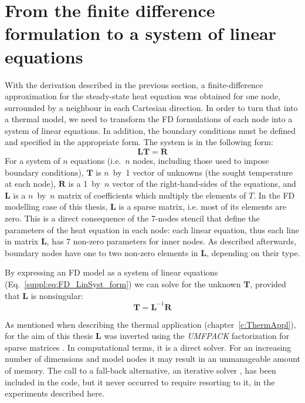 \section[
    tocentry={From the FD formulation to a system of linear equations},
    head={From the FD formulation to a system of linear equations}
    ]{From the finite difference formulation to a system of linear equations}
\label{s:ThermModel:FD_LinSyst}

With the derivation described in the previous section, a finite-difference approximation for the steady-state heat equation was obtained for one node, surrounded by a neighbour in each Cartesian direction.
In order to turn that into a thermal model, we need to transform the FD formulations of each node into a system of linear equations.
In addition, the boundary conditions must be defined and specified in the appropriate form.
The system is in the following form:
\begin{equation}
    \label{suppl:eq:FD_LinSyst_form}
    \bm{L} \bm{T} = \bm{R}
\end{equation}
For a system of $n$ equations (i.e.~$n$ nodes, including those used to impose boundary conditions), $\bm{T}$ is $n$~by~\num{1} vector of unknowns (the sought temperature at each node), $\bm{R}$ is a \num{1}~by~$n$ vector of the right-hand-sides of the equations, and $\bm{L}$ is a $n$~by~$n$ matrix of coefficients which multiply the elements of $T$.
In the FD modelling case of this thesis, $\bm{L}$ is a sparse matrix, i.e. most of its elements are zero.
This is a direct consequence of the 7-nodes stencil that define the parameters of the heat equation in each node: each linear equation, thus each line in matrix $\bm{L}$, has 7 non-zero parameters for inner nodes.
As described afterwards, boundary nodes have one to two non-zero elements in $\bm{L}$, depending on their type.

By expressing an FD model as a system of linear equations (Eq.~\ref{suppl:eq:FD_LinSyst_form}) we can solve for the unknown $\bm{T}$, provided that $\bm{L}$ is nonsingular:
\begin{equation}
    \label{suppl:eq:FD_LinSyst_inversion}
    \bm{T} = \bm{L}^{-1} \bm{R}
\end{equation}

As mentioned when describing the thermal application (chapter~\ref{c:ThermAppl}), for the aim of this thesis $\bm{L}$ was inverted using the \textit{UMFPACK} factorization for sparse matrices \parencite{Davis2006}.
In computational terms, it is a direct solver.
For an increasing number of dimensions and model nodes it may result in an unmanageable amount of memory.
The call to a fall-back alternative, an iterative solver \parencite[the generalized minimal residual method, \textit{gmres}, see][]{Saad1986gmres}, has been included in the code, but it never occurred to require resorting to it, in the experiments described here.



